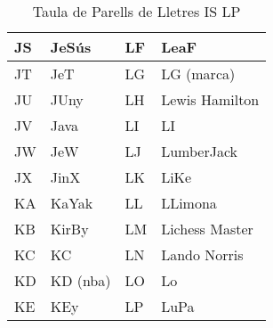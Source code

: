 \begin{table}[!ht]
\begin{tabular}{|l|l|l|l|}
    JS & JeSús                  & LF & LeaF           \\ \hline
    JT & JeT                    & LG & LG (marca)     \\ \hline
    JU & JUny                   & LH & Lewis Hamilton \\ \hline
    JV & Java                   & LI & LI             \\ \hline
    JW & JeW                    & LJ & LumberJack     \\ \hline
    JX & JinX                   & LK & LiKe           \\ \hline
    KA & KaYak                  & LL & LLimona        \\ \hline
    KB & KirBy                  & LM & Lichess Master \\ \hline
    KC & KC                     & LN & Lando Norris   \\ \hline
    KD & KD (nba)               & LO & Lo             \\ \hline
    KE & KEy                    & LP & LuPa           \\ \hline
    \end{tabular}
    \caption{Taula de Parells de Lletres IS \rightarrow LP}
    \label{tla:lletres-4}
    \end{table}

